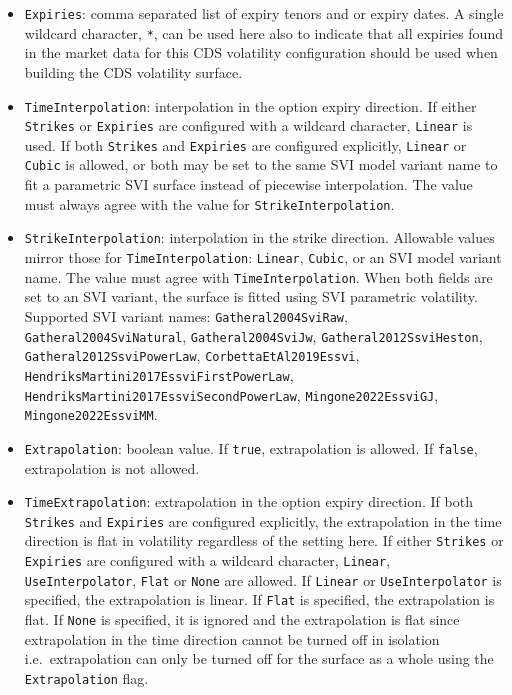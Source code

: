 \begin{itemize}
\item
\lstinline!Expiries!: comma separated list of expiry tenors and or expiry dates. A single wildcard character, \lstinline!*!, can be used here also to indicate that all expiries found in the market data for this CDS volatility configuration should be used when building the CDS volatility surface.

\item
\lstinline!TimeInterpolation!: interpolation in the option expiry direction. If either \lstinline!Strikes! or \lstinline!Expiries! are configured with a wildcard character, \lstinline!Linear! is used. If both \lstinline!Strikes! and \lstinline!Expiries! are configured explicitly, \lstinline!Linear! or \lstinline!Cubic! is allowed, or both may be set to the same SVI model variant name to fit a parametric SVI surface instead of piecewise interpolation. The value must always agree with the value for \lstinline!StrikeInterpolation!.

\item
\lstinline!StrikeInterpolation!: interpolation in the strike direction. Allowable values mirror those for \lstinline!TimeInterpolation!: \lstinline!Linear!, \lstinline!Cubic!, or an SVI model variant name. The value must agree with \lstinline!TimeInterpolation!. When both fields are set to an SVI variant, the surface is fitted using SVI parametric volatility. Supported SVI variant names: \lstinline!Gatheral2004SviRaw!, \lstinline!Gatheral2004SviNatural!, \lstinline!Gatheral2004SviJw!, \lstinline!Gatheral2012SsviHeston!, \lstinline!Gatheral2012SsviPowerLaw!, \lstinline!CorbettaEtAl2019Essvi!, \lstinline!HendriksMartini2017EssviFirstPowerLaw!, \lstinline!HendriksMartini2017EssviSecondPowerLaw!, \lstinline!Mingone2022EssviGJ!, \lstinline!Mingone2022EssviMM!.

\item
\lstinline!Extrapolation!: boolean value. If \lstinline!true!, extrapolation is allowed. If \lstinline!false!, extrapolation is not allowed.

\item
\lstinline!TimeExtrapolation!: extrapolation in the option expiry direction. If both \lstinline!Strikes! and \lstinline!Expiries! are configured explicitly, the extrapolation in the time direction is flat in volatility regardless of the setting here. If either \lstinline!Strikes! or \lstinline!Expiries! are configured with a wildcard character, \lstinline!Linear!, \lstinline!UseInterpolator!, \lstinline!Flat! or \lstinline!None! are allowed. If \lstinline!Linear! or \lstinline!UseInterpolator! is specified, the extrapolation is linear. If \lstinline!Flat! is specified, the extrapolation is flat. If \lstinline!None! is specified, it is ignored and the extrapolation is flat since extrapolation in the time direction cannot be turned off in isolation i.e.\ extrapolation can only be turned off for the surface as a whole using the \lstinline!Extrapolation! flag.


\end{itemize}
